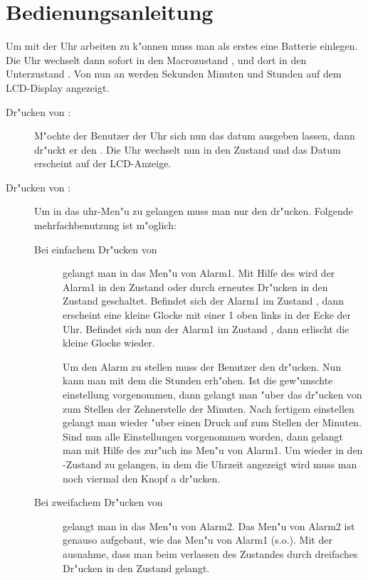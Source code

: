 \chapter{Bedienungsanleitung}
Um mit der Uhr arbeiten zu k"onnen muss man als erstes eine Batterie
einlegen. Die Uhr wechselt dann sofort in den Macrozustand , und
dort in den Unterzustand . Von nun an werden Sekunden Minuten
und Stunden auf dem LCD-Display angezeigt. 


\begin{description}
\item[Dr"ucken von :]
M"ochte der Benutzer der Uhr sich nun  das datum ausgeben lassen, dann dr"uckt
er den . Die Uhr wechselt nun in den Zustand  und das 
Datum
erscheint auf der LCD-Anzeige. 

\item[Dr"ucken von :]
Um in das uhr-Men"u zu gelangen muss man nur den  dr"ucken. 
Folgende mehrfachbenutzung ist m"oglich:
\begin{description}
\item[Bei einfachem Dr"ucken von]
gelangt man in das Men"u von Alarm1. Mit Hilfe des  wird der 
Alarm1
in den Zustand  oder durch erneutes Dr"ucken in den Zustand  
geschaltet. 
Befindet sich der Alarm1 im Zustand , dann erscheint eine kleine
Glocke mit einer 1  oben links in der Ecke der Uhr. 
Befindet sich nun der Alarm1 im Zustand , dann erlischt die kleine
Glocke wieder. 

Um den Alarm zu stellen muss der Benutzer den  dr"ucken. Nun kann 
man mit dem  die Stunden erh"ohen. Ist die gew"unschte einstellung
vorgenommen, dann gelangt man "uber das dr"ucken von  zum Stellen 
der Zehnerstelle der Minuten. Nach fertigem einstellen gelangt man wieder "uber
einen Druck auf  zum Stellen der Minuten. Sind nun alle 
Einstellungen vorgenommen worden, dann gelangt man mit Hilfe des 
 zur"uch ins Men"u von Alarm1. 
Um wieder in den -Zustand zu gelangen, in dem die Uhrzeit
angezeigt wird muss man noch viermal den Knopf a dr"ucken. 

\item[Bei zweifachem Dr"ucken von ]
gelangt man in das Men"u von Alarm2. Das Men"u von Alarm2 ist genauso
aufgebaut, wie das Men"u von Alarm1 (s.o.). Mit der ausnahme, dass man beim
verlassen des Zustandes durch dreifaches Dr"ucken in den Zustand 
gelangt. 
 

\end{description}
\end{description}
